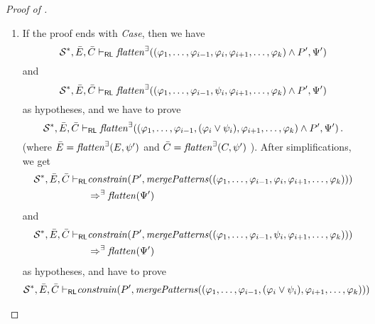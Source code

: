 \begin{proof}[Proof of ]
\begin{enumerate}
    \item If the proof ends with \emph{Case}, then we have
        \begin{equation*}
            \mathcal{S}^*, \Bar{E}, \Bar{C} \vdash_{\mathsf{RL}}
            \mathit{flatten}^\exists((\varphi_1, \ldots, \varphi_{i-1}, \varphi_i, \varphi_{i+1}, \ldots, \varphi_k) \land P^\prime, \Psi^\prime)
        \end{equation*}
        and
        \begin{equation*}
            \mathcal{S}^*, \Bar{E}, \Bar{C} \vdash_{\mathsf{RL}}
            \mathit{flatten}^\exists((\varphi_1, \ldots, \varphi_{i-1}, \psi_i, \varphi_{i+1}, \ldots, \varphi_k) \land P^\prime, \Psi^\prime) 
        \end{equation*}
        as hypotheses, and we have to prove
        \begin{equation*}
            \mathcal{S}^*, \Bar{E}, \Bar{C} \vdash_{\mathsf{RL}}
            \mathit{flatten}^\exists((\varphi_1, \ldots, \varphi_{i-1}, (\varphi_i \lor \psi_i), \varphi_{i+1}, \ldots, \varphi_k) \land P^\prime, \Psi^\prime)               \, .
        \end{equation*}
        (where $\Bar{E} = \mathit{flatten}^\exists(E, \psi^\prime)$
         and $\Bar{C} = \mathit{flatten}^\exists(C, \psi^\prime)$
        ).
        After simplifications, we get
        \begin{align*}
            \mathcal{S}^*, \Bar{E}, \Bar{C} \vdash_{\mathsf{RL}}
            &
            \mathit{constrain}(P^\prime, \mathit{mergePatterns}((\varphi_1, \ldots, \varphi_{i-1}, \varphi_i, \varphi_{i+1}, \ldots, \varphi_k)))
            \\ & \Rightarrow^\exists
            \mathit{flatten}(\Psi^\prime)
        \end{align*}
        and
        \begin{align*}
            \mathcal{S}^*, \Bar{E}, \Bar{C} \vdash_{\mathsf{RL}}
            &
            \mathit{constrain}(P^\prime, \mathit{mergePatterns}((\varphi_1, \ldots, \varphi_{i-1}, \psi_i, \varphi_{i+1}, \ldots, \varphi_k)))
            \\ & \Rightarrow^\exists
            \mathit{flatten}(\Psi^\prime)
        \end{align*}
        as hypotheses,
        and have to prove
        \begin{align*}
            \mathcal{S}^*, \Bar{E}, \Bar{C} \vdash_\RL
            &
            \mathit{constrain}(P^\prime, \mathit{mergePatterns}((\varphi_1, \ldots, \varphi_{i-1}, (\varphi_i \lor \psi_i), \varphi_{i+1}, \ldots, \varphi_k)))

\end{align*}
\end{enumerate}
\end{proof}
